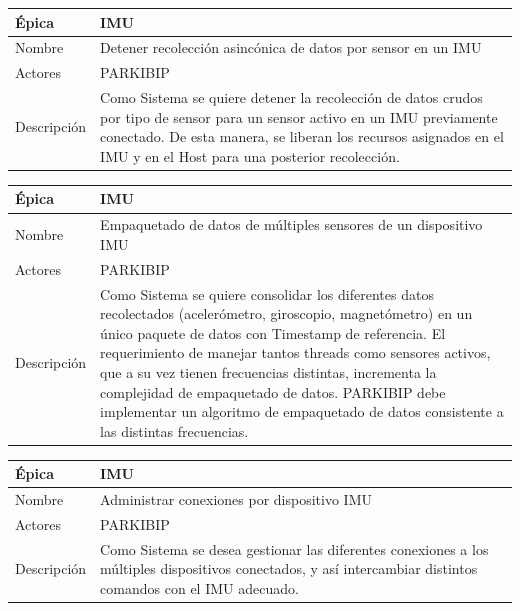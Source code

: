 \begin{table}[H] 
\centering
\begin{tabular}{| p{2cm} | p{10cm} |}
\hline
Épica & IMU\\ \hline
Nombre & Detener recolección asincónica de datos por sensor en un IMU\\ \hline
Actores & PARKIBIP\\ \hline
Descripción &  Como Sistema se quiere detener la recolección de datos crudos por tipo de sensor para un sensor activo en un IMU previamente conectado. De esta manera, se liberan los recursos asignados en el IMU y en el Host para una posterior recolección.\\ \hline
\end{tabular}
\end{table}

\begin{table}[H] 
\centering
\begin{tabular}{| p{2cm} | p{10cm} |}
\hline
Épica & IMU\\ \hline
Nombre & Empaquetado de datos de múltiples sensores de un dispositivo IMU\\ \hline
Actores & PARKIBIP\\ \hline
Descripción & Como Sistema se quiere consolidar los diferentes datos recolectados (acelerómetro, giroscopio, magnetómetro) en un único paquete de datos con Timestamp de referencia. El requerimiento de manejar tantos threads como sensores activos, que a su vez tienen frecuencias distintas, incrementa la complejidad de empaquetado de datos. PARKIBIP debe implementar un algoritmo de empaquetado de datos consistente a las distintas frecuencias. \\ \hline
\end{tabular}
\end{table}

\begin{table}[H] 
\centering
\begin{tabular}{| p{2cm} | p{10cm} |}
\hline
Épica & IMU\\ \hline
Nombre & Administrar conexiones por dispositivo IMU\\ \hline
Actores & PARKIBIP\\ \hline
Descripción & Como Sistema se desea gestionar las diferentes conexiones a los múltiples dispositivos conectados, y así intercambiar distintos comandos con el IMU adecuado.\\ \hline
\end{tabular}
\end{table}

